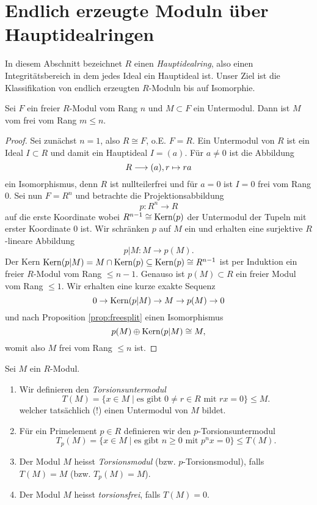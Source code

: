 \documentclass{book}
\begin{document}
\section{Endlich erzeugte Moduln über Hauptidealringen}%
\label{sub:endlich_erzeugte_moduln_uber_hauptidealringen}

In diesem Abschnitt bezeichnet $R$ einen \emph{Hauptidealring}, also einen
Integritätsbereich in dem jedes Ideal ein Hauptideal ist. Unser Ziel ist die
Klassifikation von endlich erzeugten $R$-Moduln bis auf Isomorphie. 

\begin{lem}
    \label{lem:subfree}
    Sei $F$ ein freier $R$-Modul vom Rang $n$ und $M \subset F$ ein Untermodul.
    Dann ist $M$ vom frei vom Rang $m \le n$.
\end{lem}
\begin{proof}
    Sei zunächst $n = 1$, also $R \cong F$, o.E. $F = R$. Ein Untermodul von
    $R$ ist ein Ideal $I \subset R$ und damit ein Hauptideal $I = (a)$. Für $a \ne 0$ ist die Abbildung
    \[
        R \longrightarrow (a), r \mapsto ra
    \]
    ein Isomorphismus, denn $R$ ist nullteilerfrei und für $a = 0$ ist $I = 0$ frei vom Rang $0$. Sei nun $F = R^n$ und betrachte die Projektionsabbildung
    \[
        p: R^n \to R
    \]
    auf die erste Koordinate wobei $R^{n-1} \cong \operatorname{Kern}(p)$ der Untermodul der
    Tupeln mit erster Koordinate $0$ ist. Wir schränken $p$ auf $M$ ein und
    erhalten eine surjektive $R$-lineare Abbildung
    \[
        p|M: M \to p(M).
    \]
    Der Kern $\operatorname{Kern}(p|M) = M \cap \operatorname{Kern}(p) \subseteq \operatorname{Kern}(p) \cong R^{n-1}$ ist
    per Induktion ein freier $R$-Modul vom Rang $\le n-1$. Genauso ist $p(M)
    \subset R$ ein freier Modul vom Rang $\le 1$. Wir erhalten eine kurze exakte Sequenz
    \[
        0 \to \operatorname{Kern}(p|M) \to M \to p(M) \to 0
    \]
    und nach Proposition \ref{prop:freesplit} einen Isomorphismus
    \[
        p(M) \oplus \operatorname{Kern}(p|M) \cong M,
    \]
    womit also $M$ frei vom Rang $\le n$ ist. 
\end{proof}

\begin{defi} Sei $M$ ein $R$-Modul.
    \label{defi:torsion} 
    \begin{enumerate}
        \item Wir definieren den \emph{Torsionsuntermodul}
            \[
                T(M) = \{ x \in M\; | \; \text{es gibt $0 \ne r \in R$ mit $rx = 0$} \} \le M.
            \]
            welcher tatsächlich (!) einen Untermodul von $M$ bildet.
        \item Für ein Primelement $p \in R$ definieren wir den $p$-Torsionsuntermodul
            \[
                T_p(M) = \{ x \in M\; | \; \text{es gibt $n \ge 0 $ mit $p^n x = 0$} \} \le T(M).
            \]
        \item Der Modul $M$ heisst \emph{Torsionsmodul} (bzw. $p$-Torsionsmodul), falls $T(M) = M$ (bzw. $T_p(M) = M$).
        \item Der Modul $M$ heisst \emph{torsionsfrei}, falls $T(M) = 0$. 
    \end{enumerate}    
\end{defi}
\end{document}
